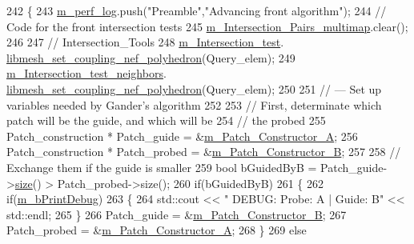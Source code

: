 \begin{DoxyCode}
242     \{
243         \hyperlink{classcarl_1_1_intersection___search_aebe6210287a36909206b1a59f9cd17e0}{m\_perf\_log}.push(\textcolor{stringliteral}{"Preamble"},\textcolor{stringliteral}{"Advancing front algorithm"});
244         \textcolor{comment}{// Code for the front intersection tests}
245         \hyperlink{classcarl_1_1_intersection___search_a21bb47bfa3021d18b718919ad4a245d7}{m\_Intersection\_Pairs\_multimap}.clear();
246 
247         \textcolor{comment}{// Intersection\_Tools}
248         \hyperlink{classcarl_1_1_intersection___search_afeedb5ff9144638151b7f956cf113fc4}{m\_Intersection\_test}.
      \hyperlink{classcarl_1_1_intersection___tools_acf2d17e703441bc9e3ed05d98f51ba85}{libmesh\_set\_coupling\_nef\_polyhedron}(Query\_elem);
249         \hyperlink{classcarl_1_1_intersection___search_a7abbfa5dc5892d9179b93563320d533b}{m\_Intersection\_test\_neighbors}.
      \hyperlink{classcarl_1_1_intersection___tools_acf2d17e703441bc9e3ed05d98f51ba85}{libmesh\_set\_coupling\_nef\_polyhedron}(Query\_elem);
250 
251         \textcolor{comment}{// --- Set up variables needed by Gander's algorithm}
252 
253         \textcolor{comment}{// First, determinate which patch will be the guide, and which will be}
254         \textcolor{comment}{// the probed}
255         Patch\_construction * Patch\_guide  = &\hyperlink{classcarl_1_1_intersection___search_a3bc66e4e9a0b41d9b20093d4f6ca7611}{m\_Patch\_Constructor\_A};
256         Patch\_construction * Patch\_probed = &\hyperlink{classcarl_1_1_intersection___search_a2e2b5a2784eeca7b558b6b93ae71a2e8}{m\_Patch\_Constructor\_B};
257 
258         \textcolor{comment}{// Exchange them if the guide is smaller}
259         \textcolor{keywordtype}{bool} bGuidedByB = Patch\_guide->\hyperlink{classcarl_1_1_patch__construction_ab9183c2cdf61de07aa77b91775286733}{size}() > Patch\_probed->size();
260         \textcolor{keywordflow}{if}(bGuidedByB)
261         \{
262             \textcolor{keywordflow}{if}(\hyperlink{classcarl_1_1_intersection___search_af69485e014f8178ec6c6dcbd95bf9dc9}{m\_bPrintDebug})
263             \{
264                 std::cout << \textcolor{stringliteral}{"    DEBUG:     Probe: A     |     Guide: B"} << std::endl;
265             \}
266             Patch\_guide  = &\hyperlink{classcarl_1_1_intersection___search_a2e2b5a2784eeca7b558b6b93ae71a2e8}{m\_Patch\_Constructor\_B};
267             Patch\_probed = &\hyperlink{classcarl_1_1_intersection___search_a3bc66e4e9a0b41d9b20093d4f6ca7611}{m\_Patch\_Constructor\_A};
268         \}
269         \textcolor{keywordflow}{else}

\end{DoxyCode}
